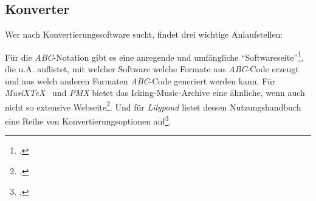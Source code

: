 %
%
%



\subsection{Konverter}

Wer nach Konvertierungssoftware sucht, findet drei wichtige Anlaufstellen:

Für die \textit{ABC}-Notation gibt es eine anregende und umfängliche
\enquote{Softwareseite}\footcite[vgl.][\nopage wp]{Abc2018b}, die u.A.
auflistet, mit welcher Software welche Formate aus \textit{ABC}-Code erzeugt und
aus welch anderen Formaten \textit{ABC}-Code generiert werden kann. Für
\textit{MusiX\TeX\ } und \textit{PMX} bietet das Icking-Music-Archive eine ähnliche,
wenn auch nicht so extensive Webseite\footcite[vgl.][\nopage wp]{Tennent2018b}.
Und für \textit{Lilypond} listet dessen Nutzungshandbuch eine Reihe von
Konvertierungsoptionen auf\footcite[vgl.][42ff]{LilyPond2018e}.


